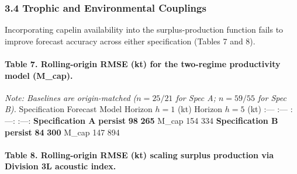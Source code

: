 \documentclass[11pt]{article}
\begin{document}
\subsubsection{3.4 Trophic and Environmental
Couplings}\label{trophic-and-environmental-couplings}

Incorporating capelin availability into the surplus-production function
fails to improve forecast accuracy across either specification (Tables 7
and 8).

\paragraph{Table 7. Rolling-origin RMSE (kt) for the two-regime
productivity model
(M\_cap).}\label{table-7.-rolling-origin-rmse-kt-for-the-two-regime-productivity-model-m_cap.}

\emph{Note: Baselines are origin-matched (\(n=25/21\) for Spec A;
\(n=59/55\) for Spec B).} \textbar{} Specification \textbar{} Forecast
Model \textbar{} Horizon \(h=1\) (kt) \textbar{} Horizon \(h=5\) (kt)
\textbar{} \textbar{} :--- \textbar{} :--- \textbar{} :---: \textbar{}
:---: \textbar{} \textbar{} \textbf{Specification A} \textbar{}
\textbf{persist} \textbar{} \textbf{98} \textbar{} \textbf{265}
\textbar{} \textbar{} \textbar{} M\_cap \textbar{} 154 \textbar{} 334
\textbar{} \textbar{} \textbf{Specification B} \textbar{}
\textbf{persist} \textbar{} \textbf{84} \textbar{} \textbf{300}
\textbar{} \textbar{} \textbar{} M\_cap \textbar{} 147 \textbar{} 894
\textbar{}

\paragraph{Table 8. Rolling-origin RMSE (kt) scaling surplus production
via Division 3L acoustic
index.}\label{table-8.-rolling-origin-rmse-kt-scaling-surplus-production-via-division-3l-acoustic-index.}
\end{document}
